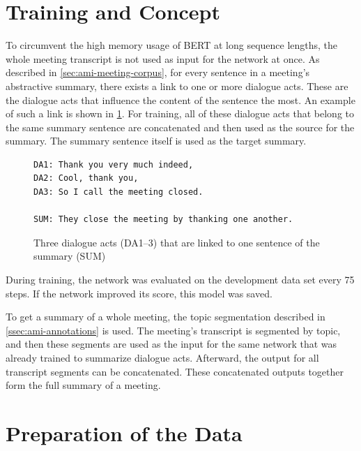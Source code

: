 
\section{Training and Concept}\label{sec:system-description-training}

To circumvent the high memory usage of BERT at long sequence lengths, the whole meeting transcript is not used as input for the network at once.
As described in \cref{sec:ami-meeting-corpus}, for every sentence in a meeting's abstractive summary, there exists a link to one or more dialogue acts.
These are the dialogue acts that influence the content of the sentence the most.
An example of such a link is shown in \cref{fig:dialogue-arc-summary-link-example}.
For training, all of these dialogue acts that belong to the same summary sentence are concatenated and then used as the source for the summary.
The summary sentence itself is used as the target summary.

\begin{figure}[h]
\begin{lstlisting}[numbers=none]
DA1: Thank you very much indeed,
DA2: Cool, thank you,
DA3: So I call the meeting closed.

SUM: They close the meeting by thanking one another.
\end{lstlisting}
\caption[Three dialogue acts that are linked to one sentence of the summary]{Three dialogue acts (DA1--3) that are linked to one sentence of the summary (SUM)}
\label{fig:dialogue-arc-summary-link-example}
\end{figure}

During training, the network was evaluated on the development data set every 75 steps.
If the network improved its score, this model was saved.

To get a summary of a whole meeting, the topic segmentation described in \cref{ssec:ami-annotations} is used.
The meeting's transcript is segmented by topic, and then these segments are used as the input for the same network that was already trained to summarize dialogue acts.
Afterward, the output for all transcript segments can be concatenated.
These concatenated outputs together form the full summary of a meeting. 

\section{Preparation of the Data}\label{sec:preparation-of-the-data}

